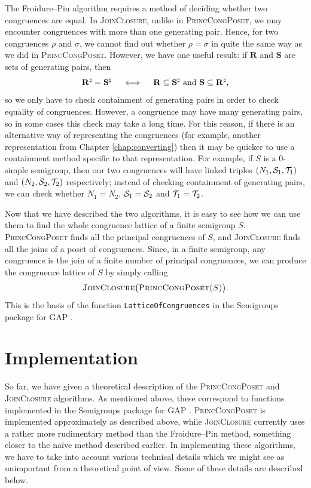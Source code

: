 The Froidure--Pin algorithm requires a method of deciding whether two
congruences are equal.  In \textsc{JoinClosure}, unlike in
\textsc{PrincCongPoset}, we may encounter congruences with more than one
generating pair.  Hence, for two congruences $\rho$ and $\sigma$, we cannot find
out whether $\rho = \sigma$ in quite the same way as we did in
\textsc{PrincCongPoset}.  However, we have one useful result: if $\mathbf{R}$
and $\mathbf{S}$ are sets of generating pairs, then
$$\mathbf{R}^\sharp = \mathbf{S}^\sharp \quad\iff\quad
\mathbf{R} \subseteq \mathbf{S}^\sharp \textnormal{~and~}
\mathbf{S} \subseteq \mathbf{R}^\sharp,$$
so we only have to check containment of generating pairs in order to check
equality of congruences.  However, a congruence may have many generating pairs,
so in some cases this check may take a long time.  For this reason, if there is
an alternative way of representing the congruences (for example, another
representation from Chapter \ref{chap:converting}) then it may be quicker to use
a containment method specific to that representation.  For example, if $S$ is a
0-simple semigroup, then our two congruences will have linked triples
$(N_1,\mathcal{S}_1,\mathcal{T}_1)$ and $(N_2,\mathcal{S}_2,\mathcal{T}_2)$ respectively; instead of checking
containment of generating pairs, we can check whether $N_1 = N_2$,
$\mathcal{S}_1 = \mathcal{S}_2$ and $\mathcal{T}_1 = \mathcal{T}_2$.

Now that we have described the two algorithms, it is easy to see how we can use
them to find the whole congruence lattice of a finite semigroup $S$.
\textsc{PrincCongPoset} finds all the principal congruences of $S$, and
\textsc{JoinClosure} finds all the joins of a poset of congruences.  Since, in a
finite semigroup, any congruence is the join of a finite number of principal
congruences, we can produce the congruence lattice of $S$ by simply calling
$$\textsc{JoinClosure\big(PrincCongPoset($S$)\big)}.$$  This is the basis of the
function \texttt{LatticeOfCongruences} in the Semigroups package for GAP
\cite{semigroups}.

\section{Implementation}
\label{sec:lattice-implementation}

So far, we have given a theoretical description of the \textsc{PrincCongPoset}
and \textsc{JoinClosure} algorithms.  As mentioned above, these correspond to
functions implemented in the Semigroups package \cite{semigroups} for GAP
\cite{gap}.  \textsc{PrincCongPoset} is implemented approximately as described
above, while \textsc{JoinClosure} currently uses a rather more rudimentary
method than the Froidure--Pin method, something closer to the na\"ive method
described earlier.  In implementing these algorithms, we have to take into
account various technical details which we might see as unimportant from a
theoretical point of view.  Some of these details are described below.

